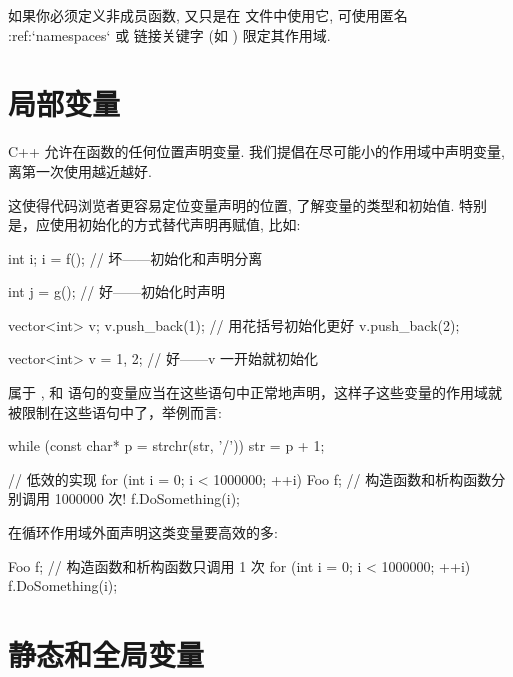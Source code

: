 如果你必须定义非成员函数, 又只是在  文件中使用它, 可使用匿名 :ref:`namespaces` 或
 链接关键字 (如 ) 限定其作用域.

\section{局部变量} \label{local-variables}


C++ 允许在函数的任何位置声明变量. 我们提倡在尽可能小的作用域中声明变量, 离第一次使用越近越好.

这使得代码浏览者更容易定位变量声明的位置, 了解变量的类型和初始值. 特别是，应使用初始化的方式替代声明再赋值, 比如:

\begin{cppcode}
  int i;
  i = f(); // 坏——初始化和声明分离

  int j = g(); // 好——初始化时声明

  vector<int> v;
  v.push_back(1); // 用花括号初始化更好
  v.push_back(2);

  vector<int> v = {1, 2}; // 好——v 一开始就初始化
\end{cppcode}

属于 ,  和 
语句的变量应当在这些语句中正常地声明，这样子这些变量的作用域就被限制在这些语句中了，举例而言:

\begin{cppcode}
  while (const char* p = strchr(str, '/')) str = p + 1;
\end{cppcode}


\begin{cppcode}
  // 低效的实现
  for (int i = 0; i < 1000000; ++i) {
      Foo f;                  // 构造函数和析构函数分别调用 1000000 次!
      f.DoSomething(i);
    }
\end{cppcode}

在循环作用域外面声明这类变量要高效的多:

\begin{cppcode}
  Foo f;                      // 构造函数和析构函数只调用 1 次
  for (int i = 0; i < 1000000; ++i) {
      f.DoSomething(i);
    }
\end{cppcode}


\section{静态和全局变量} \label{static-and-global-variables}

